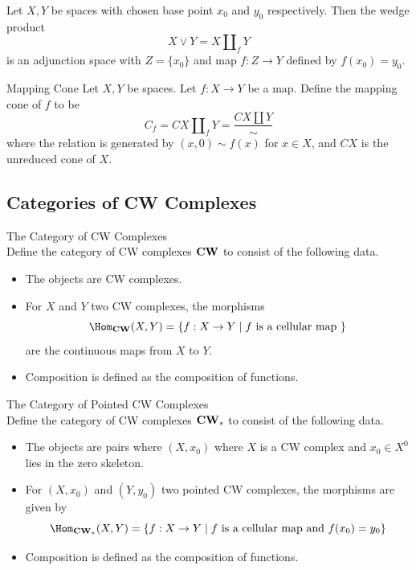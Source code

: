 \documentclass[a4paper]{article}
\begin{document}
\begin{prp}{}{} Let $X,Y$ be spaces with chosen base point $x_0$ and $y_0$ respectively. Then the wedge product $$X\vee Y=X\amalg_fY$$ is an adjunction space with $Z=\{x_0\}$ and map $f:Z\to Y$ defined by $f(x_0)=y_0$. 
\end{prp}

\begin{defn}{Mapping Cone}{} Let $X,Y$ be spaces. Let $f:X\to Y$ be a map. Define the mapping cone of $f$ to be $$C_f=CX\amalg_fY=\frac{CX\amalg Y}{\sim}$$ where the relation is generated by $(x,0)\sim f(x)$ for $x\in X$, and $CX$ is the unreduced cone of $X$. 
\end{defn}

\subsection{Categories of CW Complexes}
\begin{defn}{The Category of CW Complexes}{}\\
Define the category of CW complexes $\bold{CW}$ to consist of the following data. 
\begin{itemize}
\item The objects are CW complexes. 
\item For $X$ and $Y$ two CW complexes, the morphisms $$\Hom_{\bold{CW}}(X,Y)=\{f:X\to Y\;|\;f\text{ is a cellular map }\}$$ are the continuous maps from $X$ to $Y$. 
\item Composition is defined as the composition of functions. 
\end{itemize}
\end{defn}

\begin{defn}{The Category of Pointed CW Complexes}{}\\
Define the category of CW complexes $\bold{CW}_\ast$ to consist of the following data. 
\begin{itemize}
\item The objects are pairs where $(X,x_0)$ where $X$ is a CW complex and $x_0\in X^0$ lies in the zero skeleton. 
\item For $(X,x_0)$ and $(Y,y_0)$ two pointed CW complexes, the morphisms are given by $$\Hom_{\bold{CW}_\ast}(X,Y)=\{f:X\to Y\;|\;f\text{ is a cellular map and }f(x_0)=y_0\}$$
\item Composition is defined as the composition of functions. 
\end{itemize}
\end{defn}
\end{document}
